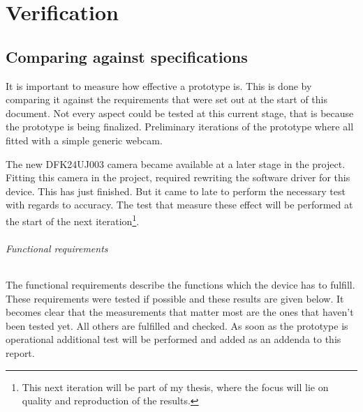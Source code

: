 \documentclass[11pt,fleqn,,a4paper,twoside,openright]{book}
\begin{document}
\part{Verification}\label{part:Verification}

\chapter{Comparing against specifications}\label{chap:CompareSpecification}
It is important to measure how effective a prototype is. This is done by comparing it against the requirements that were set out at the start of this document. Not every aspect could be tested at this current stage, that is because the prototype is being finalized. Preliminary iterations of the prototype where all fitted with a simple generic webcam.

The new DFK24UJ003 camera became available at a later stage in the project. Fitting this camera in the project, required rewriting the software driver for this device. This has just finished. But it came to late to perform the necessary test with regards to accuracy. The test that measure these effect will be performed at the start of the next iteration\footnote{This next iteration will be part of my thesis, where the focus will lie on quality and reproduction of the results.}.

\paragraph{Functional requirements}
The functional requirements describe the functions which the device has to fulfill. These requirements were tested if possible and these results are given below. It becomes clear that the measurements that matter most are the ones that haven't been tested yet. All others are fulfilled and checked. As soon as the prototype is operational additional test will be performed and added as an addenda to this report.
\end{document}
